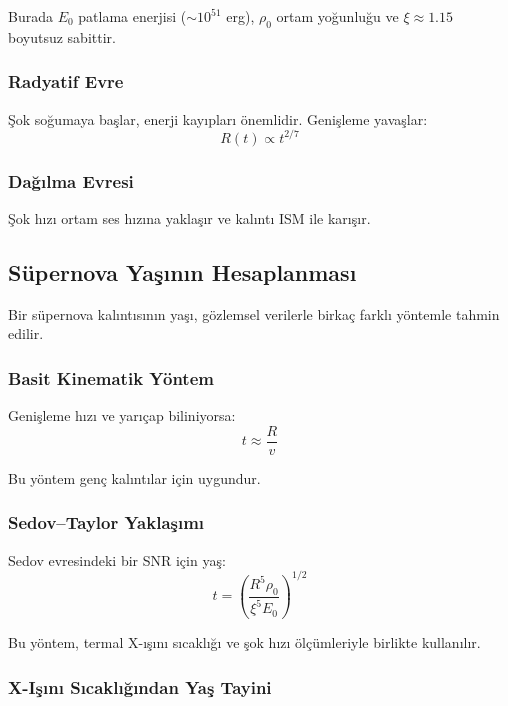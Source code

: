 Burada $E_0$ patlama enerjisi ($\sim 10^{51}$ erg), $\rho_0$ ortam yoğunluğu ve $\xi \approx 1.15$ boyutsuz sabittir.

\subsubsection{Radyatif Evre}

Şok soğumaya başlar, enerji kayıpları önemlidir. Genişleme yavaşlar:
\begin{equation}
R(t) \propto t^{2/7}
\end{equation}

\subsubsection{Dağılma Evresi}

Şok hızı ortam ses hızına yaklaşır ve kalıntı ISM ile karışır.

\subsection{Süpernova Yaşının Hesaplanması}

Bir süpernova kalıntısının yaşı, gözlemsel verilerle birkaç farklı yöntemle tahmin edilir.

\subsubsection{Basit Kinematik Yöntem}

Genişleme hızı ve yarıçap biliniyorsa:
\begin{equation}
t \approx \frac{R}{v}
\end{equation}

Bu yöntem genç kalıntılar için uygundur.

\subsubsection{Sedov--Taylor Yaklaşımı}

Sedov evresindeki bir SNR için yaş:
\begin{equation}
t = \left( \frac{R^5 \rho_0}{\xi^5 E_0} \right)^{1/2}
\end{equation}

Bu yöntem, termal X-ışını sıcaklığı ve şok hızı ölçümleriyle birlikte kullanılır.

\subsubsection{X-Işını Sıcaklığından Yaş Tayini}

